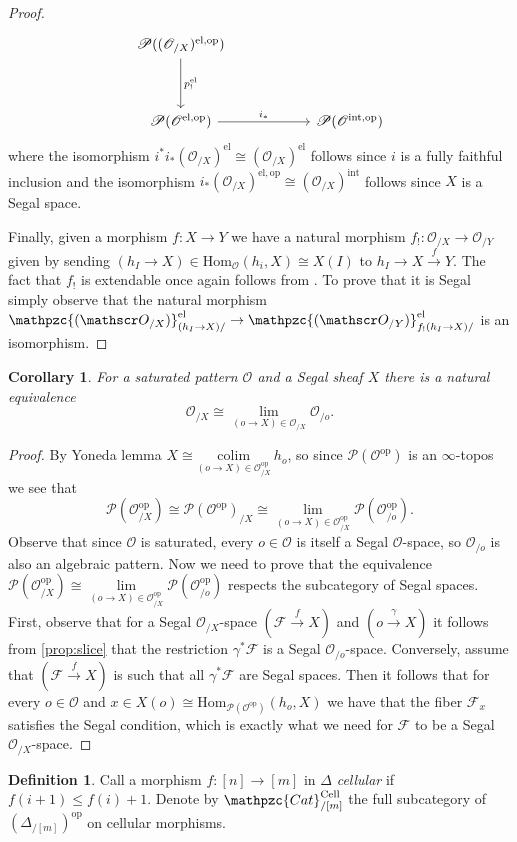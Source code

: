 \documentclass[a4paper, reqno]{amsart}
\newtheorem{cor}[theorem]{Corollary}
\theoremstyle{definition}
\newtheorem{defn}[theorem]{Definition}
\newcommand\cF{\mathscr F}
\newcommand\cO{\mathscr O}
\newcommand\cP{\mathscr P}
\newcommand\mor{\mathrm{Hom}}
\newcommand\op{\mathrm{op}}
\newcommand\colim{\mathrm{colim}}
\newcommand\inrt{\mathrm{int}}
\newcommand\el{\mathrm{el}}
\newcommand{\mElo}[2]{\mathpzc{#1}^{\mathrm{el}}_{#2/}}
\begin{document}
\begin{proof}
\[\begin{tikzcd}[row sep=huge]
\cP((\cO_{/X})^{\el,\op})\arrow[d,"p^\el_!"]\\
\cP(\cO^{\el,\op})\arrow[rr,"i_*"]&{}&\cP(\cO^{\inrt,\op})
\end{tikzcd}
\]
where the isomorphism $i^*i_*(\cO_{/X})^{\el}\cong(\cO_{/X})^{\el}$ follows since $i$ is a fully faithful inclusion and the isomorphism $i_*(\cO_{/X})^{\el,\op}\cong(\cO_{/X})^{\inrt}$ follows since $X$ is a Segal space.\par
Finally, given a morphism $f:X\rightarrow Y$ we have a natural morphism $f_!:\cO_{/X}\rightarrow\cO_{/Y}$ given by sending $(h_I\rightarrow X)\in\mor_\cO(h_i,X)\cong X(I)$ to $h_I\rightarrow X\xrightarrow{f}Y$. The fact that $f_!$ is extendable once again follows from \cite[Proposition 9.5]{chu2019homotopy}. To prove that it is Segal simply observe that the natural morphism $\mElo{(\cO_{/X})}{(h_I\rightarrow X)}\rightarrow\mElo{(\cO_{/Y})}{f_!(h_I\rightarrow X)}$ is an isomorphism.
\end{proof}
\begin{cor}\label{cor:slice}
For a saturated pattern $\cO$ and a Segal sheaf $X$ there is a natural equivalence 
\[\cO_{/X}\cong\underset{(o\rightarrow X)\in\cO_{/X}}{\lim}\cO_{/o}.\]
\end{cor}
\begin{proof}
By Yoneda lemma $X\cong \underset{(o\rightarrow X)\in\cO^\op_{/X}}{\colim}\:h_{o}$, so since $\cP(\cO^\op)$ is an $\infty$-topos we see that 
\[\cP(\cO^\op_{/X})\cong \cP(\cO^\op)_{/X}\cong \underset{(o\rightarrow X)\in\cO^\op_{/X}}{\lim}\cP(\cO^\op_{/o}).\]
Observe that since $\cO$ is saturated, every $o\in\cO$ is itself a Segal $\cO$-space, so $\cO_{/o}$ is also an algebraic pattern. Now we need to prove that the equivalence $\cP(\cO^\op_{/X})\cong\underset{(o\rightarrow X)\in\cO^\op_{/X}}{\lim}\cP(\cO^\op_{/o})$ respects the subcategory of Segal spaces. First, observe that for a Segal $\cO_{/X}$-space $(\cF\xrightarrow{f}X)$ and  $(o\xrightarrow{\gamma}X)$ it follows from \cref{prop:slice} that the restriction $\gamma^*\cF$ is a Segal $\cO_{/o}$-space. Conversely, assume that  $(\cF\xrightarrow{f}X)$ is such that all $\gamma^*\cF$ are Segal spaces. Then it follows that for every $o\in\cO$ and $x\in X(o)\cong \mor_{\cP(\cO^\op)}(h_o,X)$ we have that the fiber $\cF_x$ satisfies the Segal condition, which is exactly what we need for $\cF$ to be a Segal $\cO_{/X}$-space.
\end{proof}
\begin{defn}\label{def:cell}
Call a morphism $f:[n]\rightarrow [m]$ in $\Delta$ \textit{cellular} if $f(i+1)\leq f(i)+1$. Denote by $\mathpzc{Cat}^{\mathrm{Cell}}_{/[m]}$ the full subcategory of $(\Delta_{/[m]})^\op$ on cellular morphisms.
\end{defn}
\end{document}
